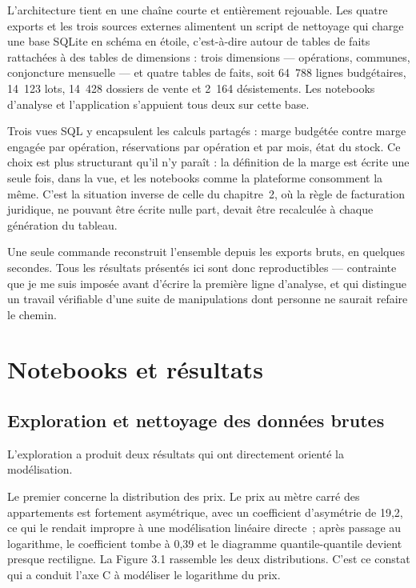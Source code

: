L'architecture tient en une chaîne courte et entièrement rejouable. Les quatre exports et les
trois sources externes alimentent un script de nettoyage qui charge une base SQLite en schéma
en étoile, c'est-à-dire autour de tables de faits rattachées à des tables de dimensions : trois
dimensions --- opérations, communes, conjoncture mensuelle --- et quatre tables de faits, soit
64~788 lignes budgétaires, 14~123 lots, 14~428 dossiers de vente et 2~164 désistements. Les
notebooks d'analyse et l'application s'appuient tous deux sur cette base.

Trois vues SQL y encapsulent les calculs partagés : marge budgétée contre marge engagée par
opération, réservations par opération et par mois, état du stock. Ce choix est plus structurant
qu'il n'y paraît : la définition de la marge est écrite une seule fois, dans la vue, et les
notebooks comme la plateforme consomment la même. C'est la situation inverse de celle du
chapitre~2, où la règle de facturation juridique, ne pouvant être écrite nulle part, devait
être recalculée à chaque génération du tableau.

Une seule commande reconstruit l'ensemble depuis les exports bruts, en quelques secondes. Tous
les résultats présentés ici sont donc reproductibles --- contrainte que je me suis imposée avant
d'écrire la première ligne d'analyse, et qui distingue un travail vérifiable d'une suite de
manipulations dont personne ne saurait refaire le chemin.

\hypertarget{notebooks-et-ruxe9sultats}{%
\section{Notebooks et résultats}\label{notebooks-et-ruxe9sultats}}

\hypertarget{exploration-et-nettoyage-des-donnuxe9es-brutes}{%
\subsection{Exploration et nettoyage des données brutes}\label{exploration-et-nettoyage-des-donnuxe9es-brutes}}

L'exploration a produit deux résultats qui ont directement orienté la modélisation.

Le premier concerne la distribution des prix. Le prix au mètre carré des appartements est
fortement asymétrique, avec un coefficient d'asymétrie de 19,2, ce qui le rendait impropre à
une modélisation linéaire directe~; après passage au logarithme, le coefficient tombe à 0,39 et
le diagramme quantile-quantile devient presque rectiligne. La Figure 3.1 rassemble les deux
distributions. C'est ce constat qui a conduit l'axe C à modéliser le logarithme du prix.

